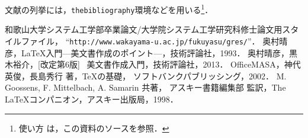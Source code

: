 \documentclass[11pt]{jreport}
\begin{document}
文献の列挙には，{\tt thebibliography}環境などを用いる\footnote{使い方
は，この資料のソースを参照．}．




\begin{thebibliography}{99}
    和歌山大学システム工学部卒業論文/大学院システム工学研究科修士論文用スタイルファイル，
    ``{\tt http://www.wakayama-u.ac.jp/fukuyasu/gres/}''．
    奥村晴彦，\LaTeX 入門---美文書作成のポイント---，技術評論社，1993．
    奥村晴彦，黒木裕介，[改定第6版] \LaTeXe~美文書作成入門，技術評論社，2013．
    OfficeMASA，神代英俊，長島秀行 著，\TeX の基礎，
    ソフトバンクパブリッシング，2002．
    M. Goossens, F. Mittelbach, A. Samarin 共著，
    アスキー書籍編集部 監訳，The \LaTeX コンパニオン，アスキー出版局，1998．
\end{thebibliography}


% 
% 
% 

\end{document}
